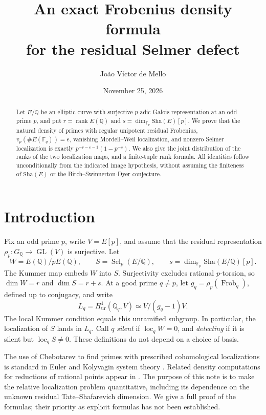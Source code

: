 \documentclass[11pt]{article}
\title{An exact Frobenius density formula\\ for the residual Selmer defect}
\author{Jo\~ao V\'ictor de Mello}
\date{November 25, 2026}
\theoremstyle{remark}\newtheorem{remark}[theorem]{Remark}
\newcommand{\Q}{\mathbb Q}\newcommand{\F}{\mathbb F}\newcommand{\Z}{\mathbb Z}
\newcommand{\Sha}{\mathop{\text{\fontencoding{U}\fontfamily{wncy}\selectfont\symbol{88}}}}
\renewcommand{\Sha}{\mathrm{Sha}}
\newcommand{\Sel}{\operatorname{Sel}}\newcommand{\Gal}{\operatorname{Gal}}\newcommand{\GL}{\operatorname{GL}}\newcommand{\loc}{\operatorname{loc}}\newcommand{\rk}{\operatorname{rank}}
\begin{document}
\maketitle
\begin{abstract}
Let $E/\Q$ be an elliptic curve with surjective $p$-adic Galois representation at an odd prime $p$, and put $r=\rk E(\Q)$ and $s=\dim_{\F_p}\Sha(E)[p]$. We prove that the natural density of primes with regular unipotent residual Frobenius, $v_p(\#E(\F_q))=e$, vanishing Mordell--Weil localization, and nonzero Selmer localization is exactly $p^{-r-e-1}(1-p^{-s})$. We also give the joint distribution of the ranks of the two localization maps, and a finite-tuple rank formula. All identities follow unconditionally from the indicated image hypothesis, without assuming the finiteness of $\Sha(E)$ or the Birch--Swinnerton-Dyer conjecture.
\end{abstract}

\section{Introduction}
Fix an odd prime $p$, write $V=E[p]$, and assume that the residual representation $\rho_p:G_{\Q}\to\GL(V)$ is surjective. Let
\[
 W=E(\Q)/pE(\Q),\qquad S=\Sel_p(E/\Q),\qquad
 s=\dim_{\F_p}\Sha(E/\Q)[p].
\]
The Kummer map embeds $W$ into $S$. Surjectivity excludes rational $p$-torsion, so $\dim W=r$ and $\dim S=r+s$. At a good prime $q\ne p$, let $g_q=\rho_p(\operatorname{Frob}_q)$, defined up to conjugacy, and write
\[
 L_q=H^1_{\mathrm{ur}}(\Q_q,V)\simeq V/(g_q-1)V.
\]
The local Kummer condition equals this unramified subgroup. In particular, the localization of $S$ lands in $L_q$. Call $q$ \emph{silent} if $\loc_q W=0$, and \emph{detecting} if it is silent but $\loc_q S\ne0$. These definitions do not depend on a choice of basis.

The use of Chebotarev to find primes with prescribed cohomological localizations is standard in Euler and Kolyvagin system theory \cite{MR}. Related density computations for reductions of rational points appear in \cite{LP}. The purpose of this note is to make the relative localization problem quantitative, including its dependence on the unknown residual Tate--Shafarevich dimension. We give a full proof of the formulas; their priority as explicit formulas has not been established.
\end{document}
